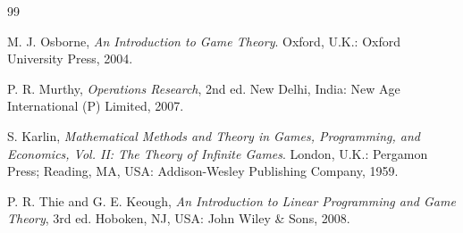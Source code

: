 \documentclass[12pt,a4paper]{article}
\begin{document}
\newpage
{}
{}
\begin{thebibliography}{99}

M. J. Osborne, \textit{An Introduction to Game Theory}. Oxford, U.K.: Oxford University Press, 2004.

P. R. Murthy, \textit{Operations Research}, 2nd ed. New Delhi, India: New Age International (P) Limited, 2007.

S. Karlin, \textit{Mathematical Methods and Theory in Games, Programming, and Economics, Vol. II: The Theory of Infinite Games}. London, U.K.: Pergamon Press; Reading, MA, USA: Addison-Wesley Publishing Company, 1959.

P. R. Thie and G. E. Keough, \textit{An Introduction to Linear Programming and Game Theory}, 3rd ed. Hoboken, NJ, USA: John Wiley \& Sons, 2008.

\end{thebibliography}
\end{document}

